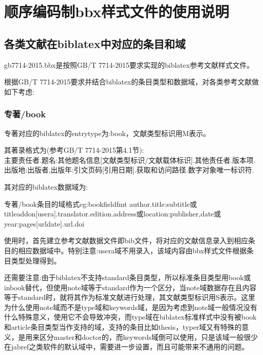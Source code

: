 \section{顺序编码制bbx样式文件的使用说明}

\subsection{各类文献在biblatex中对应的条目和域}\label{sec:numeric:data}
gb7714-2015.bbx是按照GB/T 7714-2015要求实现的biblatex参考文献样式文件。

根据GB/T 7714-2015要求并结合biblatex的条目类型和数据域，对各类参考文献做如下考虑:
\subsubsection{专著/book}
\begin{refentry}{}{}
专著对应的biblatex的entrytype为:book，文献类型标识用M表示。

其著录格式为(参考GB/T 7714-2015第4.1节):\\
主要责任者.题名:其他题名信息[文献类型标识/文献载体标识].其他责任者.版本项.出版地:出版者,出版年:引文页码[引用日期].获取和访问路径.数字对象唯一标识符.
\end{refentry}

其对应的biblatex数据域为:
\begin{codetex}{专著/book条目的域格式}{eg:bookfieldfmt}
author.title:subtitle或titleaddon[usera].translator.edition.address或location:publisher,date或year:pages[urldate].url.doi
\end{codetex}

使用时，首先建立参考文献数据文件即bib文件，将对应的文献信息录入到相应条目的相应数据域中。特别注意:usera域不用录入，该域内容由bbx样式文件根据条目类型处理得到。

还需要注意:由于biblatex不支持standard条目类型，所以标准条目类型用book或inbook替代，但使用note域等于standard作为一个区分，当note域数据存在且内容等于standard时，就将其作为标准文献进行处理，其文献类型标识用S表示。这里为什么使用note域而不是type域和keywords域，是因为考虑到note域一般情况没有什么特殊意义，使用它不会导致冲突，而type域在biblatex标准样式中没有被book和article条目类型当作支持的域，支持的条目比如thesis，typer域又有特殊的意义，是用来区分master和doctor的，而keywords域倒可以使用，只是该域一般很少在jabref之类软件的默认域中，需要进一步设置，而且可能带来不通用的问题。

